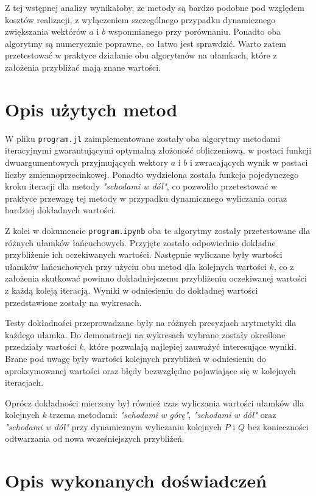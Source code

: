 \documentclass{article}
\begin{document}
Z tej wstępnej analizy wynikałoby, że metody są bardzo podobne pod względem kosztów realizacji, z wyłączeniem szczególnego przypadku dynamicznego zwiększania wektórów $a$ i $b$ wspomnianego przy porównaniu. Ponadto oba algorytmy są numerycznie poprawne, co łatwo jest sprawdzić. Warto zatem przetestować w praktyce działanie obu algorytmów na ułamkach, które z założenia przybliżać mają znane wartości.

\section{Opis użytych metod}

W pliku \texttt{program.jl} zaimplementowane zostały oba algorytmy metodami iteracyjnymi gwarantującymi optymalną złożoność obliczeniową, w postaci funkcji dwuargumentowych przyjmujących wektory $a$ i $b$ i zwracających wynik w postaci liczby zmiennoprzecinkowej. Ponadto wydzielona została funkcja pojedynczego kroku iteracji dla metody \textit{"schodami w dół"}, co pozwoliło przetestować w praktyce przewagę tej metody w przypadku dynamicznego wyliczania coraz bardziej dokładnych wartości.

Z kolei w dokumencie \texttt{program.ipynb} oba te algorytmy zostały przetestowane dla różnych ułamków łańcuchowych. Przyjęte zostało odpowiednio dokładne przybliżenie ich oczekiwanych wartości. Następnie wyliczane były wartości ułamków łańcuchowych przy użyciu obu metod dla kolejnych wartości $k$, co z założenia skutkować powinno dokładniejszemu przybliżeniu oczekiwanej wartości z każdą koleją iteracją. Wyniki w odniesieniu do dokładnej wartości przedstawione zostały na wykresach.

Testy dokładności przeprowadzane były na różnych precyzjach arytmetyki dla każdego ułamka. Do demonstracji na wykresach wybrane zostały określone przedziały wartości $k$, które pozwalają najlepiej zauważyć interesujące wyniki. Brane pod uwagę były wartości kolejnych przybliżeń w odniesieniu do aproksymowanej wartości oraz błędy bezwzględne pojawiające się w kolejnych iteracjach.

Oprócz dokładności mierzony był również czas wyliczania wartości ułamków dla kolejnych $k$ trzema metodami: \textit{"schodami w górę"}, \textit{"schodami w dół"} oraz \textit{"schodami w dół"} przy dynamicznym wyliczaniu kolejnych $P$ i $Q$ bez konieczności odtwarzania od nowa wcześniejszych przybliżeń.

\section{Opis wykonanych doświadczeń}
\end{document}
